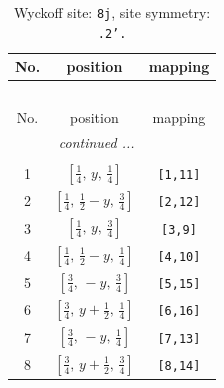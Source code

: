 \documentclass[fleqn,8pt]{jsarticle}
\begin{document}
\begin{longtable}{ccc}
\caption{Wyckoff site: {\tt 8j}, site symmetry: {\tt .2'.}}
 \\
 \hline \hline
No. & position & mapping \\ \hline \endfirsthead

\multicolumn{2}{l}{\tablename\ \thetable{}} \\
 \hline \hline
No. & position & mapping \\ \hline \endhead

 \hline \hline
\multicolumn{2}{r}{\footnotesize\it continued ...} \\ \endfoot

 \hline \hline
\multicolumn{2}{r}{} \\ \endlastfoot

1 & $\left[ \frac{1}{4},\, y,\, \frac{1}{4} \right]$ & {\tt [1,11]} \\ \hline
2 & $\left[ \frac{1}{4},\, \frac{1}{2} - y,\, \frac{3}{4} \right]$ & {\tt [2,12]} \\ \hline
3 & $\left[ \frac{1}{4},\, y,\, \frac{3}{4} \right]$ & {\tt [3,9]} \\ \hline
4 & $\left[ \frac{1}{4},\, \frac{1}{2} - y,\, \frac{1}{4} \right]$ & {\tt [4,10]} \\ \hline
5 & $\left[ \frac{3}{4},\, - y,\, \frac{3}{4} \right]$ & {\tt [5,15]} \\ \hline
6 & $\left[ \frac{3}{4},\, y + \frac{1}{2},\, \frac{1}{4} \right]$ & {\tt [6,16]} \\ \hline
7 & $\left[ \frac{3}{4},\, - y,\, \frac{1}{4} \right]$ & {\tt [7,13]} \\ \hline
8 & $\left[ \frac{3}{4},\, y + \frac{1}{2},\, \frac{3}{4} \right]$ & {\tt [8,14]} \\
\end{longtable}
\renewcommand{\arraystretch}{1.2}
\end{document}
